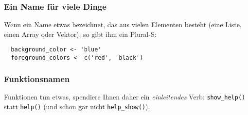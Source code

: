 \documentclass[twoside]{scrartcl}
\providecommand{\code}[1]{\texttt{#1}}
\begin{document}
\subsubsection{Ein Name f\"u{}r viele Dinge}
Wenn ein Name etwas bezeichnet, das aus vielen Elementen besteht (eine Liste,
einen Array oder Vektor), so gibt ihm ein Plural-S:
\begin{lstlisting}
  background_color <- 'blue'
  foreground_colors <- c('red', 'black')
\end{lstlisting}

\subsubsection{Funktionsnamen}
Funktionen tun etwas, spendiere Ihnen daher ein \emph{einleitendes} Verb:
\code{show\_help()} statt \code{help()} (und schon gar nicht  
\code{help\_show()}).
\end{document}
